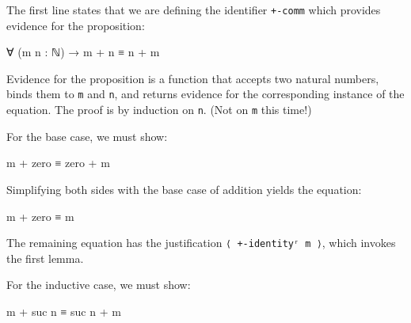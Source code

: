 \begin{fence}
\begin{code}
\AgdaOperator{\AgdaPrimitive{+}}\AgdaSpace{}%
\AgdaSymbol{)}\<%
\\
%
\>[2]\AgdaSpace{}%
\AgdaSpace{}%
\AgdaSpace{}%
\AgdaSymbol{(}\AgdaSpace{}%
\AgdaSpace{}%
\AgdaSymbol{)}\AgdaSpace{}%
\<%
\\
\>[2][@{}l@{\AgdaIndent{0}}]%
\>[4]\AgdaSpace{}%
\AgdaSymbol{(}\AgdaSpace{}%
\AgdaOperator{\AgdaPrimitive{+}}\AgdaSpace{}%
\AgdaSymbol{)}\<%
\\
%
\>[2]\<%
\\
\>[2][@{}l@{\AgdaIndent{0}}]%
\>[4]\AgdaSpace{}%
\AgdaSpace{}%
\AgdaOperator{\AgdaPrimitive{+}}\AgdaSpace{}%
\<%
\\
%
\>[2]\<%
\end{code}
\end{fence}

The first line states that we are defining the identifier
\texttt{+-comm} which provides evidence for the proposition:

\begin{myDisplay}
∀ (m n : ℕ) → m + n ≡ n + m
\end{myDisplay}

Evidence for the proposition is a function that accepts two natural
numbers, binds them to \texttt{m} and \texttt{n}, and returns evidence
for the corresponding instance of the equation. The proof is by
induction on \texttt{n}. (Not on \texttt{m} this time!)

For the base case, we must show:

\begin{myDisplay}
m + zero ≡ zero + m
\end{myDisplay}

Simplifying both sides with the base case of addition yields the
equation:

\begin{myDisplay}
m + zero ≡ m
\end{myDisplay}

The remaining equation has the justification
\texttt{⟨\ +-identityʳ\ m\ ⟩}, which invokes the first lemma.

For the inductive case, we must show:

\begin{myDisplay}
m + suc n ≡ suc n + m
\end{myDisplay}


